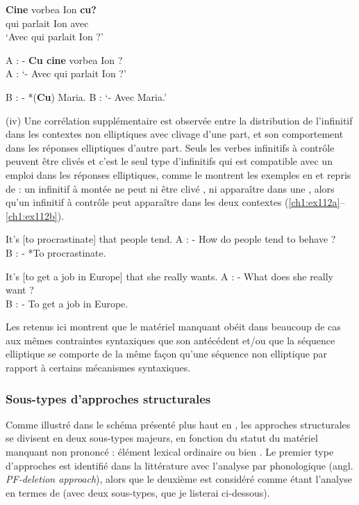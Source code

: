 \ex 
\gll *\textbf{Cine}  vorbea  Ion  \textbf{cu?} \label{ch1:ex110b}\\
qui  parlait  Ion  avec\\
\glt ‘Avec qui parlait Ion ?’ 

\ex  A : - \textbf{Cu cine} vorbea Ion ? \label{ch1:ex110c}\\
\glt A : ‘- Avec qui parlait Ion ?’ 

\ex   B : - *(\textbf{Cu})\textbf{} Maria. \label{ch1:ex110d}
\glt B : ‘- Avec Maria.’ 
\z
\z

(iv) Une corrélation supplémentaire est observée entre la distribution de l’infi\-nitif dans les contextes non elliptiques avec clivage d’une part, et son comportement dans les réponses elliptiques d’autre part. Seuls les verbes infinitifs à contrôle peuvent être clivés et c’est le seul type d’infinitifs qui est compatible avec un emploi dans les réponses elliptiques, comme le montrent les exemples en  et  repris de \citet{Merchant2009} : un infinitif à montée ne peut ni être clivé , ni apparaître dans une  , alors qu’un infinitif à contrôle peut apparaître dans les deux contextes (\ref{ch1:ex112a}--\ref{ch1:ex112b}). 

\ea \label{ch1:ex111}
\ea  *It’s [to procrastinate] that people tend. \label{ch1:ex111a}
\ex  A : - How do people tend to behave ? \label{ch1:ex111b}\\
B : - *To procrastinate.  
\z
\z

\ea \label{ch1:ex112}
\ea  It’s [to get a job in Europe] that she really wants. \label{ch1:ex112a}
\ex  A : - What does she really want ? \label{ch1:ex112b}\\
B : - To get a job in Europe.  
\z
\z

Les  retenus ici montrent que le matériel manquant obéit dans beaucoup de cas aux mêmes contraintes syntaxiques que son antécédent et/ou que la séquence elliptique se comporte de la même façon qu’une séquence non elliptique par rapport à certains mécanismes syntaxiques. 


\subsubsection{Sous-types d’approches structurales}

Comme illustré dans le schéma présenté plus haut en , les approches structurales se divisent en deux sous-types majeurs, en fonction du statut du matériel manquant non prononcé : élément lexical ordinaire ou bien . Le premier type d’approches est identifié dans la littérature avec l’analyse par  phonologique (angl. \textit{PF-deletion approach}), alors que le deuxième est considéré comme étant l’analyse en termes de  (avec deux sous-types, que je listerai ci-dessous).


